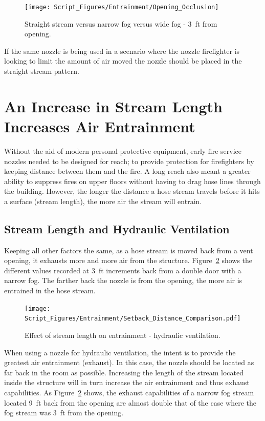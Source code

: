 \documentclass[12pt,oneside]{book}
\begin{document}
\begin{figure}[H]
\centering
\texttt{[image: Script\_Figures/Entrainment/Opening\_Occlusion]}
\caption[Straight Stream vs. Narrow Fog vs. Wide Fog - 3~ft from Opening]{Straight stream versus narrow fog versus wide fog - 3~ft from opening.}
\label{fig:StraightStream_Fog_Comp}
\end{figure}

If the same nozzle is being used in a scenario where the nozzle firefighter is looking to limit the amount of air moved the nozzle should be placed in the straight stream pattern. 

\section{An Increase in Stream Length Increases Air Entrainment}
Without the aid of modern personal protective equipment, early fire service nozzles needed to be designed for reach; to provide protection for firefighters by keeping distance between them and the fire. A long reach also meant a greater ability to suppress fires on upper floors without having to drag hose lines through the building. However, the longer the distance a hose stream travels before it hits a surface (stream length), the more air the stream will entrain.

\subsection{Stream Length and Hydraulic Ventilation}
Keeping all other factors the same, as a hose stream is moved back from a vent opening, it exhausts more and more air from the structure. Figure~\ref{fig:Setback} shows the different values recorded at 3~ft increments back from a double door with a narrow fog. The farther back the nozzle is from the opening, the more air is entrained in the hose stream. 

\begin{figure}[H]
\centering
\texttt{[image: Script\_Figures/Entrainment/Setback\_Distance\_Comparison.pdf]}
\caption[Effect of Stream Length on Entrainment - Hydraulic Ventilation]{Effect of stream length on entrainment - hydraulic ventilation.}
\label{fig:Setback}
\end{figure}

When using a nozzle for hydraulic ventilation, the intent is to provide the greatest air entrainment (exhaust). In this case, the nozzle should be located as far back in the room as possible. Increasing the length of the stream located inside the structure will in turn increase the air entrainment and thus exhaust capabilities. As Figure~\ref{fig:Setback} shows, the exhaust capabilities of a narrow fog stream located 9~ft back from the opening are almost double that of the case where the fog stream was 3~ft from the opening. 
\end{document}
